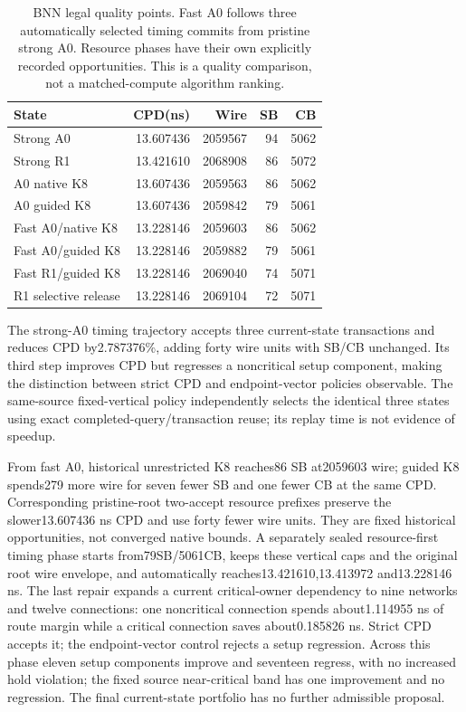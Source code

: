 \documentclass[conference,10pt]{IEEEtran}
\begin{document}
\begin{table}[t]
\centering\caption{BNN legal quality points. Fast A0 follows three automatically selected timing commits from pristine strong A0. Resource phases have their own explicitly recorded opportunities. This is a quality comparison, not a matched-compute algorithm ranking.}
\label{tab:bnn}
\small
\begin{tabular}{lrrrr}\hline
State & CPD(ns) & Wire & SB & CB\\\hline
Strong A0 &13.607436&2059567&94&5062\\
Strong R1 &13.421610&2068908&86&5072\\
A0 native K8 &13.607436&2059563&86&5062\\
A0 guided K8 &13.607436&2059842&79&5061\\
Fast A0/native K8 &13.228146&2059603&86&5062\\
Fast A0/guided K8 &13.228146&2059882&79&5061\\
Fast R1/guided K8 &13.228146&2069040&74&5071\\
R1 selective release &13.228146&2069104&72&5071\\\hline
\end{tabular}
\end{table}
The strong-A0 timing trajectory accepts three current-state transactions and reduces CPD by2.787376\%, adding forty wire units with SB/CB unchanged. Its third step improves CPD but regresses a noncritical setup component, making the distinction between strict CPD and endpoint-vector policies observable. The same-source fixed-vertical policy independently selects the identical three states using exact completed-query/transaction reuse; its replay time is not evidence of speedup.

From fast A0, historical unrestricted K8 reaches86 SB at2059603 wire; guided K8 spends279 more wire for seven fewer SB and one fewer CB at the same CPD. Corresponding pristine-root two-accept resource prefixes preserve the slower13.607436 ns CPD and use forty fewer wire units. They are fixed historical opportunities, not converged native bounds. A separately sealed resource-first timing phase starts from79SB/5061CB, keeps these vertical caps and the original root wire envelope, and automatically reaches13.421610,13.413972 and13.228146 ns. The last repair expands a current critical-owner dependency to nine networks and twelve connections: one noncritical connection spends about1.114955 ns of route margin while a critical connection saves about0.185826 ns. Strict CPD accepts it; the endpoint-vector control rejects a setup regression. Across this phase eleven setup components improve and seventeen regress, with no increased hold violation; the fixed source near-critical band has one improvement and no regression. The final current-state portfolio has no further admissible proposal.
\end{document}

